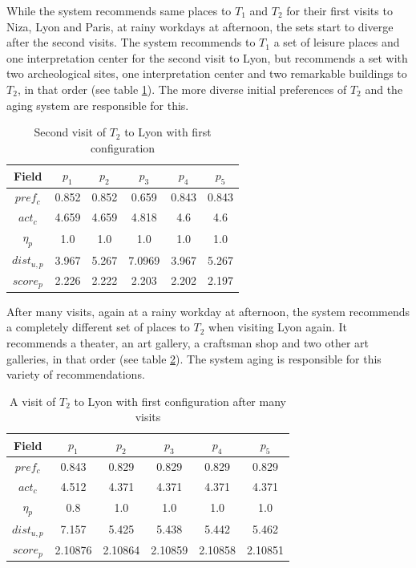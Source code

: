 While the system recommends same places to $T_1$ and $T_2$ for their first visits to Niza, Lyon and Paris, at rainy workdays at afternoon, the sets start to diverge after the second visits. The system recommends to $T_1$ a set of leisure places and one interpretation center for the second visit to Lyon, but recommends a set with two archeological sites, one interpretation center and two remarkable buildings to $T_2$, in that order (see table \ref{table:t2-1}). The more diverse initial preferences of $T_2$ and the aging system are responsible for this.

\begin{table}[h!]
    \centering
    \begin{tabular}{ |c|c|c|c|c|c| } 
        \hline
        Field   & $p_1$ & $p_2$ & $p_3$ & $p_4$ & $p_5$ \\
        \hline
        $pref_c$    &  0.852 & 0.852 & 0.659 & 0.843 & 0.843 \\
        $act_c$     & 4.659 & 4.659 & 4.818 & 4.6 & 4.6 \\
        $\eta_p$    & 1.0 & 1.0 & 1.0 & 1.0 & 1.0 \\
        $dist_{u,p}$ & 3.967 & 5.267 & 7.0969 & 3.967 & 5.267 \\
        $score_p$    & 2.226 & 2.222 & 2.203 & 2.202 & 2.197 \\
        
        \hline
    \end{tabular}
    \caption{Second visit of $T_2$ to Lyon with first configuration}
    \label{table:t2-1}
\end{table}

After many visits, again at a rainy workday at afternoon, the system recommends a completely different set of places to $T_2$ when visiting Lyon again. It recommends a theater, an art gallery, a craftsman shop and two other art galleries, in that order (see table \ref{table:t2-2}). The system aging is responsible for this variety of recommendations.
\begin{table}[h!]
    \centering
    \begin{tabular}{ |c|c|c|c|c|c| } 
        \hline
        Field   & $p_1$ & $p_2$ & $p_3$ & $p_4$ & $p_5$ \\
        \hline
        $pref_c$    &  0.843 & 0.829 & 0.829 & 0.829 & 0.829 \\
        $act_c$     & 4.512 & 4.371 & 4.371 & 4.371 & 4.371 \\
        $\eta_p$    & 0.8 & 1.0 & 1.0 & 1.0 & 1.0 \\
        $dist_{u,p}$ & 7.157 & 5.425 & 5.438 & 5.442 & 5.462 \\
        $score_p$    & 2.10876 & 2.10864 & 2.10859 & 2.10858 & 2.10851 \\
        
        \hline
    \end{tabular}
    \caption{A visit of $T_2$ to Lyon with first configuration after many visits}
    \label{table:t2-2}
\end{table}

